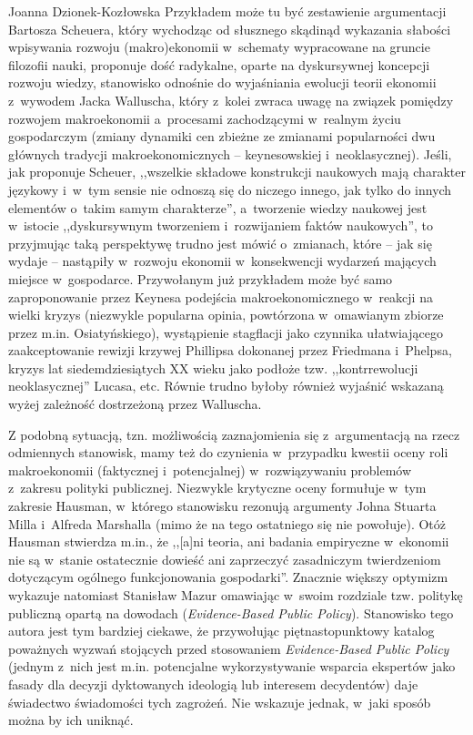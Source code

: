 \begin{recplenv}{Joanna Dzionek-Kozłowska}
Przykładem może tu być zestawienie argumentacji Bartosza Scheuera, który wychodząc od słusznego skądinąd wykazania
słabości wpisywania rozwoju (makro)ekonomii w~schematy wypracowane na gruncie filozofii nauki, proponuje dość
radykalne, oparte na dyskursywnej koncepcji rozwoju wiedzy, stanowisko odnośnie do wyjaśniania ewolucji teorii ekonomii
z~wywodem Jacka Walluscha, który z~kolei zwraca uwagę na związek pomiędzy rozwojem makroekonomii a~procesami
zachodzącymi w~realnym życiu gospodarczym (zmiany dynamiki cen zbieżne ze zmianami popularności dwu głównych tradycji
makroekonomicznych -- keynesowskiej i~neoklasycznej). Jeśli, jak proponuje Scheuer, ,,wszelkie składowe konstrukcji
naukowych mają charakter językowy i~w~tym sensie nie odnoszą się do niczego innego, jak tylko do innych
elementów o~takim samym charakterze'', a~tworzenie wiedzy naukowej jest w~istocie ,,dyskursywnym tworzeniem i~rozwijaniem faktów
naukowych'', to przyjmując taką perspektywę trudno jest mówić o~zmianach, które -- jak się wydaje -- nastąpiły w~rozwoju
ekonomii w~konsekwencji wydarzeń mających miejsce w~gospodarce. Przywołanym już przykładem może być samo zaproponowanie
przez Keynesa podejścia makroekonomicznego w~reakcji na wielki kryzys (niezwykle popularna opinia,
powtórzona w~omawianym zbiorze przez m.in. Osiatyńskiego), wystąpienie stagflacji jako czynnika
ułatwiającego zaakceptowanie rewizji
krzywej Phillipsa dokonanej przez Friedmana i~Phelpsa, kryzys lat siedemdziesiątych XX wieku jako podłoże tzw.
,,kontrrewolucji neoklasycznej'' Lucasa, etc. Równie trudno byłoby również wyjaśnić wskazaną wyżej zależność dostrzeżoną
przez Walluscha.

\enlargethispage{.5\baselineskip}

Z podobną sytuacją, tzn. możliwością zaznajomienia się z~argumentacją na rzecz odmiennych stanowisk, mamy też do
czynienia w~przypadku kwestii oceny roli makroekonomii (faktycznej i~potencjalnej) w~rozwiązywaniu problemów z~zakresu
polityki publicznej. Niezwykle krytyczne oceny formułuje w~tym zakresie Hausman, w~którego stanowisku rezonują
argumenty Johna Stuarta Milla i~Alfreda Marshalla (mimo że na tego ostatniego się nie powołuje). Otóż Hausman stwierdza
m.in., że ,,[a]ni teoria, ani badania empiryczne w~ekonomii nie są w~stanie ostatecznie dowieść ani zaprzeczyć
zasadniczym twierdzeniom dotyczącym ogólnego funkcjonowania gospodarki''. Znacznie większy optymizm wykazuje natomiast
Stanisław Mazur omawiając w~swoim rozdziale tzw. politykę publiczną opartą na dowodach (\textit{Evidence-Based Public
Policy}). Stanowisko tego autora jest tym bardziej ciekawe, że przywołując piętnastopunktowy katalog poważnych wyzwań
stojących przed stosowaniem \textit{Evidence-Based Public Policy} (jednym z~nich jest m.in. potencjalne wykorzystywanie
wsparcia ekspertów jako fasady dla decyzji dyktowanych ideologią lub interesem decydentów) daje świadectwo świadomości
tych zagrożeń. Nie wskazuje jednak, w~jaki sposób można by ich uniknąć.


\end{recplenv}
